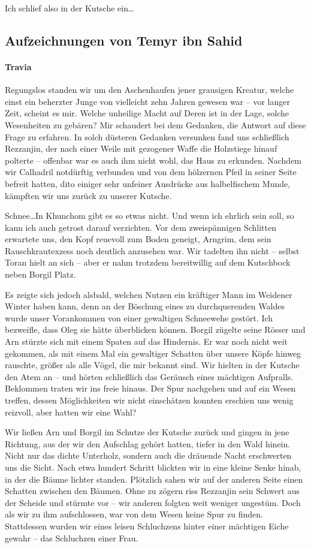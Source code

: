 Ich schlief also in der Kutsche ein\dots 

\subsection{Aufzeichnungen von Temyr ibn Sahid}

\paragraph{Travia}
Regungslos standen wir um den Aschenhaufen jener grausigen Kreatur, welche einst ein beherzter Junge von vielleicht zehn Jahren gewesen war -- vor langer Zeit, scheint es mir. Welche unheilige Macht auf Deren ist in der Lage, solche Wesenheiten zu gebären? Mir schaudert bei dem Gedanken, die Antwort auf diese Frage zu erfahren. In solch düsteren Gedanken versunken fand uns schließlich Rezzanjin, der nach einer Weile mit gezogener Waffe die Holzstiege hinauf polterte -- offenbar war es auch ihm nicht wohl, das Haus zu erkunden. Nachdem wir Calhadril notdürftig verbunden und von dem hölzernen Pfeil in seiner Seite befreit hatten, dito einiger sehr unfeiner Ausdrücke aus halbelfischem Munde, kämpften wir uns zurück zu unserer Kutsche. 


Schnee\dots In Khunchom gibt es so etwas nicht. Und wenn ich ehrlich sein soll, so kann ich auch getrost darauf verzichten. Vor dem zweispännigen Schlitten erwartete uns, den Kopf reuevoll zum Boden geneigt, Arngrim, dem sein Rauschkrautexzess noch deutlich anzusehen war. Wir tadelten ihn nicht -- selbst Toran hielt an sich -- aber er nahm trotzdem bereitwillig auf dem Kutschbock neben Borgil Platz. 


Es zeigte sich jedoch alsbald, welchen Nutzen ein kräftiger Mann im Weidener Winter haben kann, denn an der Böschung eines zu durchquerenden Waldes wurde unser Vorankommen von einer gewaltigen Schneewehe gestört. Ich bezweifle, dass Oleg sie hätte überblicken können. Borgil zügelte seine Rösser und Arn stürzte sich mit einem Spaten auf das Hindernis. Er war noch nicht weit gekommen, als mit einem Mal ein gewaltiger Schatten über unsere Köpfe hinweg rauschte, größer als alle Vögel, die mir bekannt sind. Wir hielten in der Kutsche den Atem an -- und hörten schließlich das Geräusch eines mächtigen Aufpralls. Beklommen traten wir ins freie hinaus. Der Spur nachgehen und auf ein Wesen treffen, dessen Möglichkeiten wir nicht einschätzen konnten erschien uns wenig reizvoll, aber hatten wir eine Wahl?


Wir ließen Arn und Borgil im Schutze der Kutsche zurück und gingen in jene Richtung, aus der wir den Aufschlag gehört hatten, tiefer in den Wald hinein. Nicht nur das dichte Unterholz, sondern auch die dräuende Nacht erschwerten uns die Sicht. Nach etwa hundert Schritt blickten wir in eine kleine Senke hinab, in der die Bäume lichter standen. Plötzlich sahen wir auf der anderen Seite einen Schatten zwischen den Bäumen. Ohne zu zögern riss Rezzanjin sein Schwert aus der Scheide und stürmte vor -- wir anderen folgten weit weniger ungestüm. Doch als wir zu ihm aufschlossen, war von dem Wesen keine Spur zu finden. Stattdessen wurden wir eines leisen Schluchzens hinter einer mächtigen Eiche gewahr -- das Schluchzen einer Frau.

